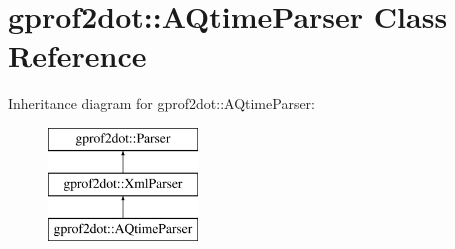 \hypertarget{classgprof2dot_1_1AQtimeParser}{
\section{gprof2dot::AQtimeParser Class Reference}
\label{classgprof2dot_1_1AQtimeParser}
}
Inheritance diagram for gprof2dot::AQtimeParser:\begin{figure}[H]
\begin{center}
\leavevmode
\includegraphics[height=3.000000cm]{classgprof2dot_1_1AQtimeParser}
\end{center}
\end{figure}
